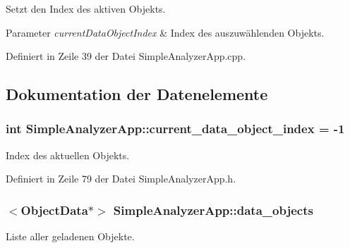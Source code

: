 Setzt den Index des aktiven Objekts. 


\begin{DoxyParams}{Parameter}
{\em current\-Data\-Object\-Index} & Index des auszuwählenden Objekts. \\
\hline
\end{DoxyParams}


Definiert in Zeile 39 der Datei Simple\-Analyzer\-App.\-cpp.



\subsection{Dokumentation der Datenelemente}
\hypertarget{classSimpleAnalyzerApp_a79ee2f69d43e2a32ba3c33c2560966e2}{
\subsubsection[{current\-\_\-data\-\_\-object\-\_\-index}]{\setlength{\rightskip}{0pt plus 5cm}int Simple\-Analyzer\-App\-::current\-\_\-data\-\_\-object\-\_\-index = -\/1\hspace{0.3cm}{\ttfamily [private]}}}\label{classSimpleAnalyzerApp_a79ee2f69d43e2a32ba3c33c2560966e2}


Index des aktuellen Objekts. 



Definiert in Zeile 79 der Datei Simple\-Analyzer\-App.\-h.

\hypertarget{classSimpleAnalyzerApp_a99bb49d6e0ec4d6f03ad08c29cf63288}{
\subsubsection[{data\-\_\-objects}]{$<${\bf Object\-Data}$\ast$$>$ Simple\-Analyzer\-App\-::data\-\_\-objects\hspace{0.3cm}{\ttfamily [private]}}}\label{classSimpleAnalyzerApp_a99bb49d6e0ec4d6f03ad08c29cf63288}


Liste aller geladenen Objekte. 



